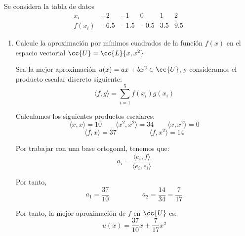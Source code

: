 \begin{ejercicio}
    Se considera la tabla de datos
    \begin{equation*}
        \begin{array}{c|c|c|c|c|c}
            x_i & -2 & -1 & 0 & 1 & 2 \\ \hline
            f(x_i)& -6.5 &-1.5 &-0.5& 3.5 &9.5
        \end{array}
    \end{equation*}


    \begin{enumerate}
        \item Calcule la aproximación por mínimos cuadrados de la función $f(x)$ en el espacio vectorial $\cc{U}=\cc{L}\{x,x^2\}$

        Sea la mejor aproximación $u(x)=ax + bx^2\in \cc{U}$, y consideramos el producto escalar discreto siguiente:
        \begin{equation*}
            \langle f,g\rangle = \sum_{i=1}^5 f(x_i)g(x_i)
        \end{equation*}

        Calculamos los siguientes productos escalares:
        \begin{equation*}
            \langle x,x\rangle = 10 \qquad \langle x^2, x^2\rangle = 34 \qquad \langle x,x^2\rangle = 0
        \end{equation*}
        \begin{equation*}
            \langle f,x\rangle = 37 \hspace{2cm} \langle f, x^2\rangle = 14
        \end{equation*}

        Por trabajar con una base ortogonal, tenemos que:
        \begin{equation*}
            a_i = \frac{\langle e_i, f\rangle}{\langle e_i, e_i \rangle}
        \end{equation*}

        Por tanto,
        \begin{equation*}
            a_1 = \frac{37}{10} \hspace{2cm} a_2 = \frac{14}{34} = \frac{7}{17}
        \end{equation*}

        Por tanto, la mejor aproximación de $f$ en $\cc{U}$ es:
        \begin{equation*}
            u(x) = \frac{37}{10}x + \frac{7}{17}x^2
        \end{equation*}
        


\end{enumerate}
\end{ejercicio}
